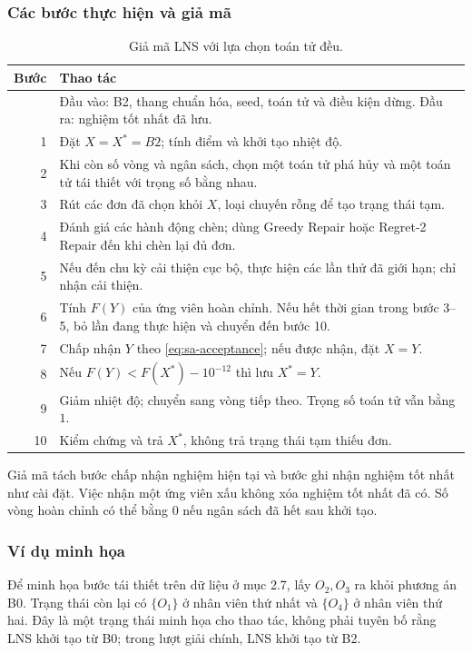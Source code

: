 \subsubsection{Các bước thực hiện và giả mã}
\begin{table}[H]
\centering\small
\begin{tabularx}{\linewidth}{rX}
\toprule
Bước & Thao tác \\
\midrule
 & Đầu vào: B2, thang chuẩn hóa, seed, toán tử và điều kiện dừng. Đầu ra: nghiệm tốt nhất đã lưu. \\
1 & Đặt $X=X^*=B2$; tính điểm và khởi tạo nhiệt độ. \\
2 & Khi còn số vòng và ngân sách, chọn một toán tử phá hủy và một toán tử tái thiết với trọng số bằng nhau. \\
3 & Rút các đơn đã chọn khỏi $X$, loại chuyến rỗng để tạo trạng thái tạm. \\
4 & Đánh giá các hành động chèn; dùng Greedy Repair hoặc Regret-2 Repair đến khi chèn lại đủ đơn. \\
5 & Nếu đến chu kỳ cải thiện cục bộ, thực hiện các lần thử đã giới hạn; chỉ nhận cải thiện. \\
6 & Tính $F(Y)$ của ứng viên hoàn chỉnh. Nếu hết thời gian trong bước 3--5, bỏ lần đang thực hiện và chuyển đến bước 10. \\
7 & Chấp nhận $Y$ theo \eqref{eq:sa-acceptance}; nếu được nhận, đặt $X=Y$. \\
8 & Nếu $F(Y)<F(X^*)-10^{-12}$ thì lưu $X^*=Y$. \\
9 & Giảm nhiệt độ; chuyển sang vòng tiếp theo. Trọng số toán tử vẫn bằng $1$. \\
10 & Kiểm chứng và trả $X^*$, không trả trạng thái tạm thiếu đơn. \\
\bottomrule
\end{tabularx}
\caption{Giả mã LNS với lựa chọn toán tử đều.}\label{tab:lns-pseudocode}
\end{table}
Giả mã tách bước chấp nhận nghiệm hiện tại và bước ghi nhận nghiệm tốt nhất như cài đặt. Việc nhận một ứng viên xấu không xóa nghiệm tốt nhất đã có. Số vòng hoàn chỉnh có thể bằng $0$ nếu ngân sách đã hết sau khởi tạo.

\subsubsection{Ví dụ minh họa}
Để minh họa bước tái thiết trên dữ liệu ở mục 2.7, lấy $O_2,O_3$ ra khỏi phương án B0. Trạng thái còn lại có $\{O_1\}$ ở nhân viên thứ nhất và $\{O_4\}$ ở nhân viên thứ hai. Đây là một trạng thái minh họa cho thao tác, không phải tuyên bố rằng LNS khởi tạo từ B0; trong lượt giải chính, LNS khởi tạo từ B2.

